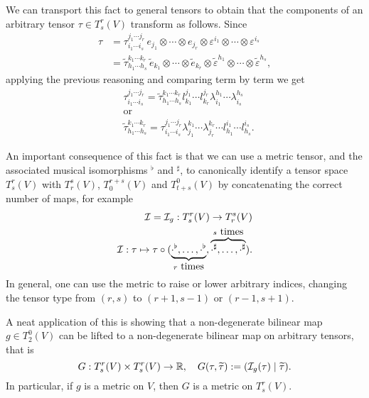 We can transport this fact to general tensors to obtain that the components of an arbitrary tensor $\tau\in T^r_s(V)$ transform as follows.
Since
\begin{align}
  \tau
  &=
  \tau^{j_1\cdots j_r}_{i_1\cdots i_s} \, e_{j_1}\otimes\cdots\otimes e_{j_r}\otimes \varepsilon^{i_1}\otimes \cdots\otimes \varepsilon^{i_s} \\
  &= \widetilde\tau^{k_1\cdots k_r}_{h_1\cdots h_s} \, \widetilde e_{k_1}\otimes\cdots\otimes \widetilde e_{k_r}\otimes \widetilde\varepsilon^{h_1}\otimes \cdots\otimes \widetilde\varepsilon^{h_s},
\end{align}
applying the previous reasoning and comparing term by term we get
\begin{align}
  &\tau^{j_1\cdots j_r}_{i_1\cdots i_s} = \widetilde\tau^{k_1\cdots k_r}_{h_1\cdots h_s} l_{k_1}^{j_1}\cdots l_{k_r}^{j_r} \lambda_{i_1}^{h_1}\cdots \lambda_{i_s}^{h_s}\\
  &\mbox{or}\\
  &\widetilde\tau^{k_1\cdots k_r}_{h_1\cdots h_s} = \tau^{j_1\cdots j_r}_{i_1\cdots i_s} \lambda_{j_1}^{k_1}\cdots \lambda_{j_r}^{k_r}\cdots l_{h_1}^{i_1}\cdots l_{h_s}^{i_s}.
\end{align}

\begin{remark}
  An important consequence of this fact is that we can use a metric tensor, and the associated musical isomorphisms ${}^\flat$ and ${}^\sharp$, to canonically identify a tensor space $T_s^r(V)$ with $T_r^s(V)$, $T_0^{r+s}(V)$ and $T_{t+s}^0(V)$ by concatenating the correct number of maps, for example
  \begin{align}
    \cI = \cI_g : T_s^r (V) \to T_r^s(V) \\
    \cI : \tau \mapsto \tau \circ (\LaTeXunderbrace{{\cdot}^\flat, \ldots, {\cdot}^\flat}_{r\mbox{ times}}, \LaTeXoverbrace{{\cdot}^\sharp, \ldots, {\cdot}^\sharp}^{s\mbox{ times}}).
  \end{align}
  In general, one can use the metric to raise or lower arbitrary indices, changing the tensor type from $(r,s)$ to $(r+1, s-1)$ or $(r-1, s+1)$.

  A neat application of this is showing that a non-degenerate bilinear map $g\in T_2^0(V)$ can be lifted to a non-degenerate bilinear map on arbitrary tensors, that is
  \begin{equation}
    G: T_s^r(V)\times T_s^r(V) \to \mathbb{R},
    \quad 
    G(\tau, \widetilde\tau) := (\mathcal{I}_g(\tau)\mid \widetilde\tau).
  \end{equation}
  In particular, if $g$ is a metric on $V$, then $G$ is a metric on $T_s^r(V)$.
\end{remark}

